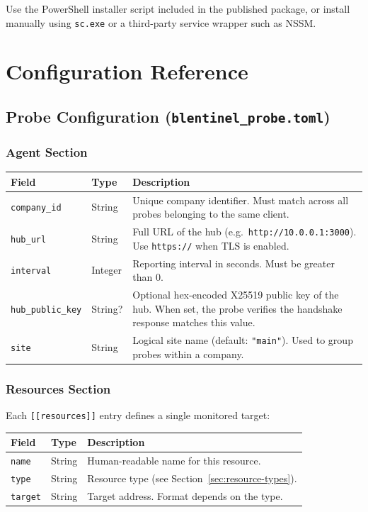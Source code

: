 \documentclass[12pt]{report}
\begin{document}
Use the PowerShell installer script included in the published package, or
install manually using \texttt{sc.exe} or a third-party service wrapper such
as NSSM.

\section{Configuration Reference}

\subsection{Probe Configuration (\texttt{blentinel\_probe.toml})}

\subsubsection{Agent Section}

\begin{longtable}{@{} l l p{7cm} @{}}
\toprule
\textbf{Field} & \textbf{Type} & \textbf{Description} \\
\midrule
\texttt{company\_id} & String & Unique company identifier. Must match across
    all probes belonging to the same client. \\
\texttt{hub\_url} & String & Full URL of the hub (e.g.\
    \texttt{http://10.0.0.1:3000}). Use \texttt{https://} when TLS is
    enabled. \\
\texttt{interval} & Integer & Reporting interval in seconds. Must be greater
    than 0. \\
\texttt{hub\_public\_key} & String? & Optional hex-encoded X25519 public key
    of the hub. When set, the probe verifies the handshake response matches
    this value. \\
\texttt{site} & String & Logical site name (default: \texttt{"main"}). Used
    to group probes within a company. \\
\bottomrule
\end{longtable}

\subsubsection{Resources Section}

Each \texttt{[[resources]]} entry defines a single monitored target:

\begin{longtable}{@{} l l p{7cm} @{}}
\toprule
\textbf{Field} & \textbf{Type} & \textbf{Description} \\
\midrule
\texttt{name} & String & Human-readable name for this resource. \\
\texttt{type} & String & Resource type (see Section~\ref{sec:resource-types}).
    \\
\texttt{target} & String & Target address. Format depends on the type. \\
\bottomrule
\end{longtable}
\end{document}
